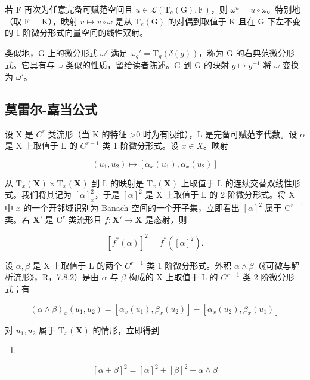 若 F 再次为任意完备可赋范空间且 \(u \in \mathcal{L}(\mathrm{T}_{e}(\mathrm{G}), \mathrm{F})\)，则 \(\omega^{u} = u \circ \omega\)。特别地（取 F = K），映射 \(v \mapsto v \circ \omega\) 是从 \(\mathrm{T}_{e}(\mathrm{G})\) 的对偶到取值于 K 且在 G 下左不变的 1 阶微分形式向量空间的线性双射。

类似地，G 上的微分形式 \(\omega'\) 满足 \(\omega_g' = \mathrm{T}_g(\delta(g))\)，称为 G 的右典范微分形式。它具有与 \(\omega\) 类似的性质，留给读者陈述。G 到 G 的映射 \(g \mapsto g^{-1}\) 将 \(\omega\) 变换为 \(\omega'\)。

\subsection{莫雷尔-嘉当公式}

设 X 是 \(C^{r}\) 类流形（当 K 的特征 \textgreater0 时为有限维），L 是完备可赋范李代数。设 \(\alpha\) 是 X 上取值于 L 的 \(C^{r-1}\) 类 1 阶微分形式。设 \(x \in X\)。映射

\[
(u _ {1}, u _ {2}) \mapsto [ \alpha_ {x} (u _ {1}), \alpha_ {x} (u _ {2}) ]
\]

从 \(\mathrm{T}_x(\mathbf{X})\times \mathrm{T}_x(\mathbf{X})\) 到 L 的映射是 \(\mathrm{T}_x(\mathbf{X})\) 上取值于 L 的连续交替双线性形式。我们将其记为 \([\alpha ]_x^2\)，于是 \([\alpha ]^2\) 是 X 上取值于 L 的 2 阶微分形式。将 X 中 \(x\) 的一个开邻域识别为 Banach 空间的一个开子集，立即看出 \([\alpha ]^2\) 属于 \(\mathrm{C}^{r - 1}\) 类。若 \(\mathbf{X}'\) 是 \(\mathrm{C}^r\) 类流形且 \(f\colon \mathbf{X}'\to \mathbf{X}\) 是态射，则

\[
[ f ^ {*} (\alpha) ] ^ {2} = f ^ {*} ([ \alpha ] ^ {2}).\tag{28}
\]

设 \(\alpha, \beta\) 是 X 上取值于 L 的两个 \(C^{r-1}\) 类 1 阶微分形式。外积 \(\alpha \wedge \beta\)（《可微与解析流形》，R，7.8.2）是由 \(\alpha\) 与 \(\beta\) 构成的 X 上取值于 L 的 \(C^{r-1}\) 类 2 阶微分形式；有

\[
(\alpha \wedge \beta) _ {x} (u _ {1}, u _ {2}) = [ \alpha_ {x} (u _ {1}), \beta_ {x} (u _ {2}) ] - [ \alpha_ {x} (u _ {2}), \beta_ {x} (u _ {1}) ]\tag{29}
\]

对 \(u_{1}, u_{2}\) 属于 \(\mathrm{T}_x(\mathbf{X})\) 的情形，立即得到

\begin{enumerate}
\def\labelenumi{(\arabic{enumi})}
\setcounter{enumi}{29}
\tightlist
\item
\end{enumerate}

\[
[ \alpha + \beta ] ^ {2} = [ \alpha ] ^ {2} + [ \beta ] ^ {2} + \alpha \wedge \beta\tag{31}
\]

